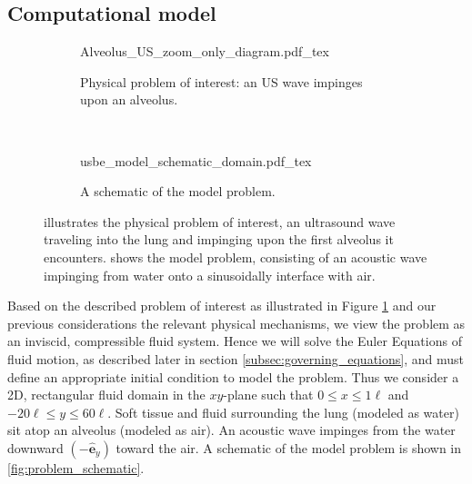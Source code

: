 \documentclass{article}
\newcommand{\bs}[1]{\boldsymbol{#1}}
\begin{document}
\subsection{Computational model}
\label{subsec:setup}
%
\begin{figure}[!h]
  \centering
  \begin{subfigure}[b]{0.45\textwidth}
    \centering
    \def\svgwidth{\textwidth}
    {Alveolus_US_zoom_only_diagram.pdf_tex} \hfill%
    \caption{\label{fig:alveolar_schematic} Physical problem of interest: an \ac{US} wave impinges upon an alveolus.}
  \end{subfigure}
  ~
  \begin{subfigure}[b]{0.45\textwidth}
    \centering
    \def\svgwidth{\textwidth}
    {usbe_model_schematic_domain.pdf_tex} \hfill%
    \caption{\label{fig:problem_schematics} A schematic of the model problem.}
  \end{subfigure}
  \caption[A schematic view of the physical and model
  problems]{\protect{} illustrates the
    physical problem of interest, an ultrasound wave traveling into
    the lung and impinging upon the first alveolus it
    encounters. \protect{} shows the model
    problem, consisting of an acoustic wave impinging from water onto
    a sinusoidally interface with air.}
  \label{fig:schematics}
\end{figure}
% 
Based on the described problem of interest as illustrated in Figure
\ref{fig:alveolar_schematic} and our previous considerations the
relevant physical mechanisms, we view the problem as an inviscid,
compressible fluid system. Hence we will solve the Euler Equations of
fluid motion, as described later in section
\ref{subsec:governing_equations}, and must define an appropriate
initial condition to model the problem. Thus we consider a 2D,
rectangular fluid domain in the $xy$-plane such that
$0\leq x\leq 1\ell$ and $-20\ell\leq y\leq 60\ell$. Soft tissue and
fluid surrounding the lung (modeled as water) sit atop an alveolus
(modeled as air). An acoustic wave impinges from the water downward
$(-\bs{\hat{e}}_y)$ toward the air. A schematic of the model problem
is shown in \ref{fig:problem_schematic}.
\end{document}
